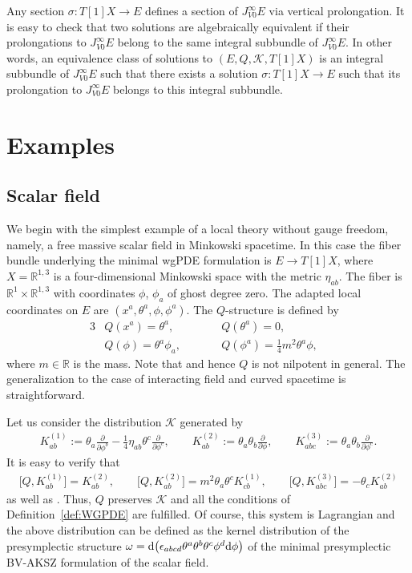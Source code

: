\documentclass[pdftex]{sigma}
\numberwithin{equation}{section}
\theoremstyle{definition}
\newcommand{\fR}{\mathbb{R}}
\def\cK{\mathcal{K}}
\begin{document}
Any section $\sigma\colon T[1]X\to E$ defines a section of $J^\infty_{V0}E$ via vertical prolongation. It is easy to check that two solutions are algebraically equivalent if their prolongations to $J^\infty_{V0} E$ belong to the same integral subbundle of $J^\infty_{V0} E$. In other words, an equivalence class of solutions to $(E,Q,\cK,T[1]X)$ is an integral subbundle of $J^\infty_{V0} E$ such that there exists a solution $\sigma\colon T[1]X \to E$ such that its prolongation to $J^\infty_{V0} E$ belongs to this integral subbundle.

\section{Examples} \label{sec:examples}

\subsection{Scalar field }
We begin with the simplest example of a local theory without gauge freedom, namely, a free massive scalar field in Minkowski spacetime. In this case the fiber bundle underlying the minimal wgPDE formulation is $E\rightarrow T[1]X$, where $X=\mathbb{R}^{1,3}$ is a four-dimensional Minkowski space with the metric $\eta_{ab}$. The fiber is $\fR^1 \times \fR^{1,3}$ with coordinates $\phi$, $\phi_a$ of ghost degree zero. The adapted local coordinates on $E$ are $(x^a,\theta^a,\phi,\phi^a)$. The $Q$-structure is defined by
\begin{alignat*}{3}
 &Q(x^a)=\theta^a, \qquad&& Q(\theta^a)=0,&\\
 &Q(\phi)=\theta^a\phi_a, \qquad&& Q(\phi^a)=\frac{1}{4}m^2\theta^a\phi,&
\end{alignat*}
where $m\in\mathbb{R}$ is the mass. Note that  and hence $Q$ is not nilpotent in general. The generalization to the case of interacting field and curved spacetime is straightforward.

Let us consider the distribution $\mathcal{K}$ generated by
\begin{gather}
 K^{(1)}_{ab}:=\theta_a\frac{\partial}{\partial \phi^b}-\frac{1}{4}\eta_{ab}\theta^c\frac{\partial}{\partial\phi^c},\qquad K^{(2)}_{ab}:=\theta_a\theta_b\frac{\partial}{\partial\phi},\qquad
 K^{(3)}_{abc}:=\theta_a\theta_b\frac{\partial}{\partial\phi^c}.\label{scald}
 \end{gather}
It is easy to verify that
\begin{gather*}
 \bigl[Q, K^{(1)}_{ab}\bigr]=K^{(2)}_{ab},\qquad
 \bigl[Q, K^{(2)}_{ab}\bigr]=m^2\theta_a\theta^cK^{(1)}_{cb},\qquad
 \bigl[Q, K^{(3)}_{abc}\bigr]=-\theta_cK^{(2)}_{ab}
\end{gather*}
as well as .
Thus, $Q$ preserves $\cK$ and all the conditions of Definition~\ref{def:WGPDE} are fulfilled. Of course, this system is Lagrangian and the above distribution can be defined as the kernel distribution of the presymplectic structure $\omega={\rm d}\bigl(\epsilon_{abcd}\theta^a\theta^b\theta^c \phi^d {\rm d}\phi\bigr)$ of the minimal presymplectic BV-AKSZ formulation of the scalar field.
\end{document}
